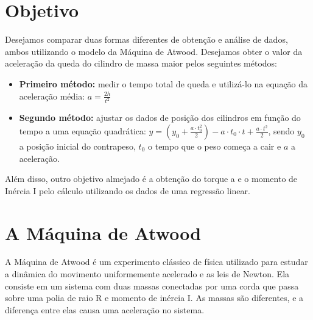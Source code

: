 \documentclass[a4papper, 10pt]{article}
\begin{document}
\section{Objetivo}
\vspace{0.10 cm}
Desejamos comparar duas formas diferentes de obtenção e análise de dados, ambos utilizando o modelo da Máquina de Atwood. Desejamos obter o valor da aceleração da queda do cilindro de massa maior pelos seguintes métodos:\\
\begin{itemize}
    \item \textbf{Primeiro método:} medir o tempo total de queda e utilizá-lo na equação da aceleração média: $a = \frac{2h}{t^2}$
    \item \textbf{Segundo método:} ajustar os dados de posição dos cilindros em função do tempo a uma equação quadrática: $y = \left(y_0 + \frac{a \cdot t_0^2}{2}\right) - a \cdot t_0 \cdot t + \frac{a \cdot t^2}{2}$,
    sendo \(y_0\) a posição inicial do contrapeso, \(t_0\) o tempo que o peso começa a cair e \(a\) a aceleração.\\
\end{itemize}
Além disso, outro objetivo almejado é a obtenção do torque a e o momento de Inércia I pelo cálculo utilizando os dados de uma regressão linear. 
\vspace{0.10 cm}
\section{A Máquina de Atwood}
\vspace{0.10 cm}
A Máquina de Atwood é um experimento clássico de física utilizado para estudar a dinâmica do movimento uniformemente acelerado e as leis de Newton. Ela consiste em um sistema com duas massas  conectadas por uma corda que passa sobre uma polia de raio R e momento de inércia I. As massas são diferentes, e a diferença entre elas causa uma aceleração no sistema.
\end{document}
